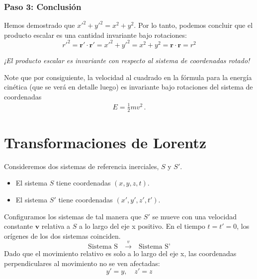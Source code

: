 \documentclass[11pt,a4paper]{article}
\begin{document}
\subsubsection*{Paso 3: Conclusión}
Hemos demostrado que $x'^2 + y'^2 = x^2 + y^2$. Por lo tanto, podemos concluir que el producto escalar es una cantidad invariante bajo rotaciones:
\[
\boxed{
{r'}^2=\boldsymbol{r}' \cdot \boldsymbol{r}' = x'^2 + y'^2 = x^2 + y^2 = \boldsymbol{r} \cdot \boldsymbol{r} = r^2
}
\]


\vspace{1em} %
\noindent %
\textit{¡El producto escalar es invariante con respecto al sistema de coordenadas rotado!}


Note que por consiguiente, la velocidad al cuadrado en la fórmula para la energía cinética (que se verá en detalle luego) es invariante bajo rotaciones del sistema de coordenadas
\begin{align*}
    E =\frac{1}{2}m v^2\,.
\end{align*}

\section{Transformaciones de Lorentz}

Consideremos dos sistemas de referencia inerciales, $S$ y $S'$.
\begin{itemize}
    \item El sistema $S$ tiene coordenadas $(x, y, z, t)$.
    \item El sistema $S'$ tiene coordenadas $(x', y', z', t')$.
\end{itemize}
Configuramos los sistemas de tal manera que $S'$ se mueve con una velocidad constante $\boldsymbol{v}$ relativa a $S$ a lo largo del eje x positivo. En el tiempo $t=t'=0$, los orígenes de los dos sistemas coinciden.
\[
\text{Sistema S} \quad \xrightarrow{v} \quad \text{Sistema S'}
\]
Dado que el movimiento relativo es solo a lo largo del eje x, las coordenadas perpendiculares al movimiento no se ven afectadas:
\[ y' = y, \quad z' = z \]
\end{document}
